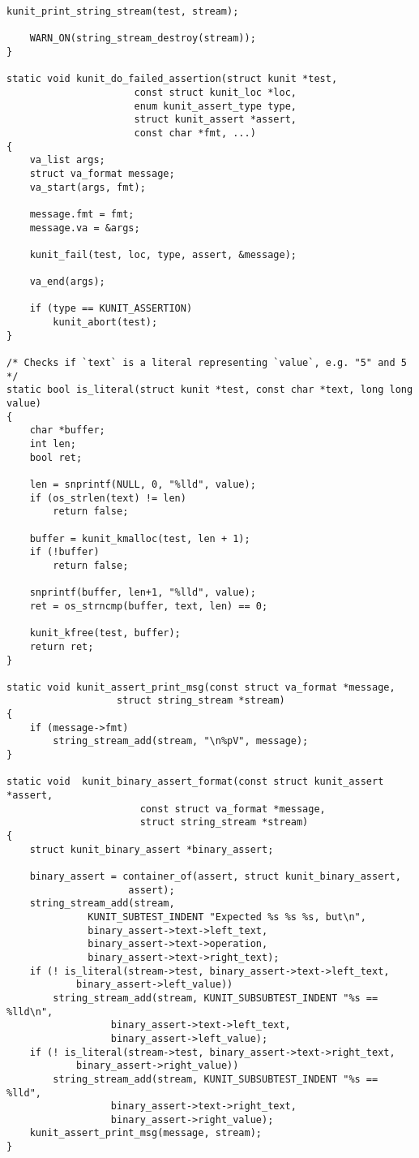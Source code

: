 \documentclass{article}
\begin{document}
\begin{lstlisting}[style=CStyle]
	kunit_print_string_stream(test, stream);

	WARN_ON(string_stream_destroy(stream));
}

static void kunit_do_failed_assertion(struct kunit *test,
				      const struct kunit_loc *loc,
				      enum kunit_assert_type type,
				      struct kunit_assert *assert,
				      const char *fmt, ...)
{
	va_list args;
	struct va_format message;
	va_start(args, fmt);

	message.fmt = fmt;
	message.va = &args;

	kunit_fail(test, loc, type, assert, &message);

	va_end(args);

	if (type == KUNIT_ASSERTION)
		kunit_abort(test);
}

/* Checks if `text` is a literal representing `value`, e.g. "5" and 5 */
static bool is_literal(struct kunit *test, const char *text, long long value)
{
	char *buffer;
	int len;
	bool ret;

	len = snprintf(NULL, 0, "%lld", value);
	if (os_strlen(text) != len)
		return false;

	buffer = kunit_kmalloc(test, len + 1);
	if (!buffer)
		return false;

	snprintf(buffer, len+1, "%lld", value);
	ret = os_strncmp(buffer, text, len) == 0;

	kunit_kfree(test, buffer);
	return ret;
}

static void kunit_assert_print_msg(const struct va_format *message,
				   struct string_stream *stream)
{
	if (message->fmt)
		string_stream_add(stream, "\n%pV", message);
}

static void  kunit_binary_assert_format(const struct kunit_assert *assert,
				       const struct va_format *message,
				       struct string_stream *stream)
{
	struct kunit_binary_assert *binary_assert;

	binary_assert = container_of(assert, struct kunit_binary_assert,
				     assert);
	string_stream_add(stream,
			  KUNIT_SUBTEST_INDENT "Expected %s %s %s, but\n",
			  binary_assert->text->left_text,
			  binary_assert->text->operation,
			  binary_assert->text->right_text);
	if (! is_literal(stream->test, binary_assert->text->left_text,
			binary_assert->left_value))
		string_stream_add(stream, KUNIT_SUBSUBTEST_INDENT "%s == %lld\n",
				  binary_assert->text->left_text,
				  binary_assert->left_value);
	if (! is_literal(stream->test, binary_assert->text->right_text,
			binary_assert->right_value))
		string_stream_add(stream, KUNIT_SUBSUBTEST_INDENT "%s == %lld",
				  binary_assert->text->right_text,
				  binary_assert->right_value);
	kunit_assert_print_msg(message, stream);
}


\end{lstlisting}
\end{document}
